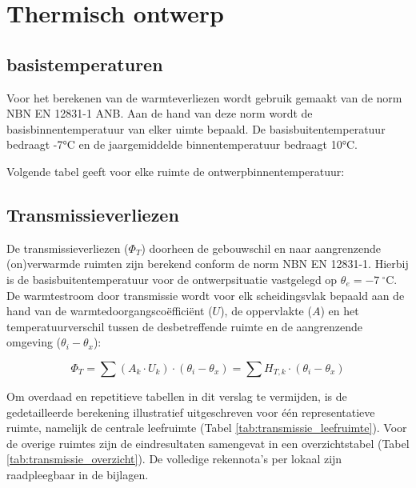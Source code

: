 \documentclass[a4paper,12pt]{article}
\begin{document}
\section{Thermisch ontwerp}

\subsection{basistemperaturen}
Voor het berekenen van de warmteverliezen wordt gebruik gemaakt van de norm NBN EN 12831-1 ANB. Aan de hand van deze norm wordt de basisbinnentemperatuur van elker uimte bepaald. De basisbuitentemperatuur bedraagt -7°C en de jaargemiddelde binnentemperatuur bedraagt 10°C. 

Volgende tabel geeft voor elke ruimte de ontwerpbinnentemperatuur: 

\subsection{Transmissieverliezen}


De transmissieverliezen ($\Phi_T$) doorheen de gebouwschil en naar aangrenzende (on)verwarmde ruimten zijn berekend conform de norm NBN EN 12831-1. Hierbij is de basisbuitentemperatuur voor de ontwerpsituatie vastgelegd op $\theta_e = -7~^\circ\text{C}$. De warmtestroom door transmissie wordt voor elk scheidingsvlak bepaald aan de hand van de warmtedoorgangscoëfficiënt ($U$), de oppervlakte ($A$) en het temperatuurverschil tussen de desbetreffende ruimte en de aangrenzende omgeving ($\theta_i - \theta_x$):

\begin{equation}
    \Phi_T = \sum (A_k \cdot U_k) \cdot (\theta_i - \theta_x) = \sum H_{T,k} \cdot (\theta_i - \theta_x)
\end{equation}

Om overdaad en repetitieve tabellen in dit verslag te vermijden, is de gedetailleerde berekening illustratief uitgeschreven voor één representatieve ruimte, namelijk de centrale leefruimte (Tabel \ref{tab:transmissie_leefruimte}). Voor de overige ruimtes zijn de eindresultaten samengevat in een overzichtstabel (Tabel \ref{tab:transmissie_overzicht}). De volledige rekennota's per lokaal zijn raadpleegbaar in de bijlagen.
\end{document}
